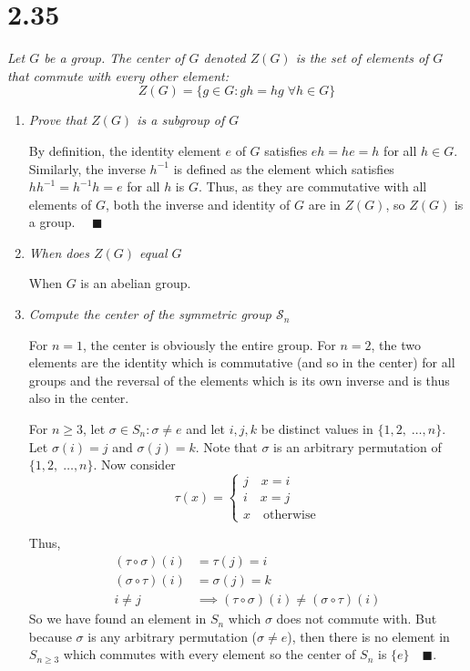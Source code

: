 \documentclass[12pt]{article}
\newcommand{\qed}{\quad \blacksquare}
\begin{document}
\section*{2.35}
\emph{Let $G$ be a group. The center of $G$ denoted $Z(G)$ is the set of elements of $G$ that commute with every other element:}
\[Z(G) = \{g \in G: gh = hg \; \forall h \in G\}\]

\begin{enumerate}[label=(\alph*)]
    \item \emph{Prove that $Z(G)$ is a subgroup of $G$}
    
    \color{blue}
        By definition, the identity element $e$ of $G$ satisfies $eh = he = h$ for all $h \in G$. Similarly, the inverse $h^{-1}$ is defined as the element which satisfies $hh^{-1} = h^{-1}h = e$ for all $h$ is $G$. Thus, as they are commutative with all elements of $G$, both the inverse and identity of $G$ are in $Z(G)$, so $Z(G)$ is a group. $\qed$
    \color{black}

    \item \emph{When does $Z(G)$ equal $G$ }
    
    \color{blue}
        When $G$ is an abelian group.
    \color{black}

    \item \emph{Compute the center of the symmetric group $\mathcal{S}_n$}
    
    \color{blue}
        For $n = 1$, the center is obviously the entire group. For $n = 2$, the two elements are the identity which is commutative (and so in the center) for all groups and the reversal of the elements which is its own inverse and is thus also in the center.

        For $n \geq 3$, let $\sigma \in S_n: \sigma \neq e$ and let $i, j, k$ be distinct values in $\{1, 2,\; \dots, n\}$. Let $\sigma(i) = j$ and $\sigma(j) = k$. Note that $\sigma$ is an arbitrary permutation of $\{1, 2,\; \dots, n\}$. Now consider 
        \[\tau(x) = \begin{cases}
            j \quad x = i\\
            i \quad x = j\\
            x \quad \text{otherwise}
        \end{cases}\]

        Thus,
        \begin{align*}
            (\tau \circ \sigma)(i) &= \tau(j) = i\\
            (\sigma \circ \tau)(i) &= \sigma(j) = k\\
            i \neq j &\implies (\tau \circ \sigma)(i) \neq (\sigma \circ \tau)(i)
        \end{align*}
        So we have found an element in $S_n$ which $\sigma$ does not commute with. But because $\sigma$ is any arbitrary permutation ($\sigma \neq e$), then there is no element in $S_{n\geq 3}$ which commutes with every element so the center of $S_n$ is $\{e\} \qed$.  
    \color{black}
    

\end{enumerate}
\end{document}
